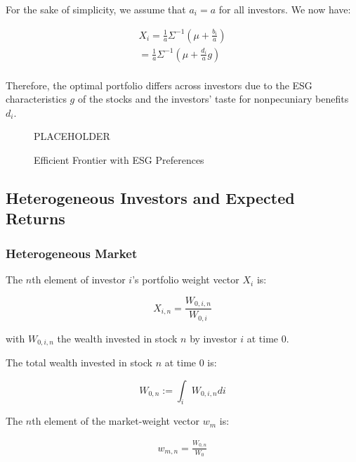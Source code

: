 For the sake of simplicity, we assume that $a_i = a$ for all investors.
We now have:

\begin{equation}
    \begin{aligned}
    X_i = \frac{1}{a} \Sigma^{-1}(\mu + \frac{b_i}{a}) \\
    = \frac{1}{a} \Sigma^{-1}(\mu + \frac{d_i}{a}g) \\
    \end{aligned}
\end{equation}

Therefore, the optimal portfolio differs across investors due to the
ESG characteristics $g$ of the stocks and the investors' taste for
nonpecuniary benefits $d_i$. 


\begin{figure}
    \centering
    PLACEHOLDER
    \caption{Efficient Frontier with ESG Preferences}
    \label{fig:esg_taste}
\end{figure}

\subsection{Heterogeneous Investors and Expected Returns}


\subsubsection{Heterogeneous Market}

The $n$th element of investor $i$'s portfolio weight vector $X_i$ is:

\begin{equation}
    X_{i,n} = \frac{W_{0,i,n}}{W_{0,i}}
\end{equation}

with $W_{0,i,n}$ the wealth invested in stock $n$ by investor $i$ at time 0.

The total wealth invested in stock $n$ at time 0 is:

\begin{equation}
    W_{0,n} := \int_i W_{0,i,n} di
\end{equation}

The $n$th element of the market-weight vector $w_m$ is:

\begin{equation}
    \begin{aligned}
    w_{m,n} = \frac{W_{0,n}}{W_{0}} \\
    \end{aligned}
\end{equation}

